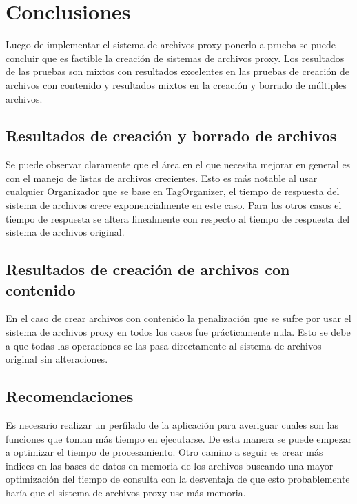 \def\baselinestretch{1}
\chapter{Conclusiones}
\ifpdf
    \graphicspath{{Conclusions/ConclusionsFigs/PNG/}{Conclusions/ConclusionsFigs/PDF/}{Conclusions/ConclusionsFigs/}}
\else
    \graphicspath{{Conclusions/ConclusionsFigs/EPS/}{Conclusions/ConclusionsFigs/}}
\fi

Luego de implementar el sistema de archivos proxy ponerlo a prueba se puede concluir que es factible la creación de sistemas de archivos proxy. Los resultados de las pruebas son mixtos con resultados excelentes en las pruebas de creación de archivos con contenido y resultados mixtos en la creación y borrado de múltiples archivos.

\section{Resultados de creación y borrado de archivos}

Se puede observar claramente que el área en el que necesita mejorar en general es con el manejo de listas de archivos crecientes. Esto es más notable al usar cualquier Organizador que se base en TagOrganizer, el tiempo de respuesta del sistema de archivos crece exponencialmente en este caso. Para los otros casos el tiempo de respuesta se altera linealmente con respecto al tiempo de respuesta del sistema de archivos original.

\section{Resultados de creación de archivos con contenido}

En el caso de crear archivos con contenido la penalización que se sufre por usar el sistema de archivos proxy en todos los casos fue prácticamente nula. Esto se debe a que todas las operaciones se las pasa directamente al sistema de archivos original sin alteraciones.

\section{Recomendaciones}

Es necesario realizar un perfilado de la aplicación para averiguar cuales son las funciones que toman más tiempo en ejecutarse. De esta manera se puede empezar a optimizar el tiempo de procesamiento. Otro camino a seguir es crear más indices en las bases de datos en memoria de los archivos buscando una mayor optimización del tiempo de consulta con la desventaja de que esto probablemente haría que el sistema de archivos proxy use más memoria.





